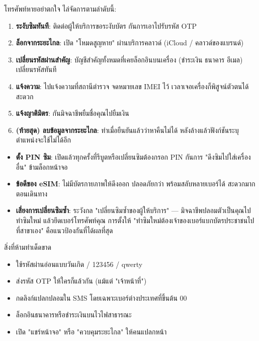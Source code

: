 โทรศัพท์หายอย่าตกใจ ไล่จัดการตามลำดับนี้:

\begin{enumerate}
  \item \textbf{ระงับซิมทันที}: ติดต่อผู้ให้บริการขอระงับบัตร กันการเอาไปรับรหัส OTP
  \item \textbf{ล็อกจากระยะไกล}: เปิด "โหมดสูญหาย" ผ่านบริการคลาวด์ (iCloud / คลาวด์ของแบรนด์)
  \item \textbf{เปลี่ยนรหัสผ่านสำคัญ}: บัญชีสำคัญทั้งหมดที่เคยล็อกอินบนเครื่อง (ชำระเงิน ธนาคาร อีเมล) เปลี่ยนรหัสทันที
  \item \textbf{แจ้งความ}: ไปแจ้งความที่สถานีตำรวจ จดหมายเลข IMEI ไว้ เวลาเจอเครื่องก็พิสูจน์ตัวตนได้สะดวก
  \item \textbf{แจ้งญาติมิตร}: กันมิจฉาชีพยืมชื่อคุณไปยืมเงิน
  \item \textbf{(ท้ายสุด) ลบข้อมูลจากระยะไกล}: ทำเมื่อยืนยันแล้วว่าหาคืนไม่ได้ หลังล้างแล้วฟังก์ชันระบุตำแหน่งจะใช้ไม่ได้อีก
\end{enumerate}


\begin{itemize}
  \item \textbf{ตั้ง PIN ซิม}: เปิดแล้วทุกครั้งที่รีบูตหรือเปลี่ยนซิมต้องกรอก PIN กันการ "ดึงซิมไปใส่เครื่องอื่น" ข้ามล็อกหน้าจอ
  \item \textbf{ข้อดีของ eSIM}: ไม่มีบัตรกายภาพให้ดึงออก ปลอดภัยกว่า พร้อมสลับหลายเบอร์ได้ สะดวกมากตอนเดินทาง
  \item \textbf{เสี่ยงการเปลี่ยนซิมซ้ำ}: ระวังกล "เปลี่ยนซิมซ้ำของผู้ให้บริการ" — มิจฉาชีพปลอมตัวเป็นคุณไปทำซิมใหม่ แล้วยึดเบอร์โทรศัพท์คุณ การตั้งให้ "ทำซิมใหม่ต้องเจ้าของเบอร์แบกบัตรประชาชนไปที่สาขาเอง" คือแนวป้องกันที่ได้ผลที่สุด
\end{itemize}

\begin{tcbwarn}{สิ่งที่ห้ามทำเด็ดขาด}
\begin{itemize}
  \item ใช้รหัสผ่านอ่อนแบบวันเกิด / 123456 / qwerty
  \item ส่งรหัส OTP ให้ใครก็แล้วกัน (แม้แต่ "เจ้าหน้าที่")
  \item กดลิงก์แปลกปลอมใน SMS โดยเฉพาะเบอร์ต่างประเทศที่ขึ้นต้น 00
  \item ล็อกอินธนาคารหรือชำระเงินบนไวไฟสาธารณะ
  \item เปิด "แชร์หน้าจอ" หรือ "ควบคุมระยะไกล" ให้คนแปลกหน้า
\end{itemize}

\end{tcbwarn}

